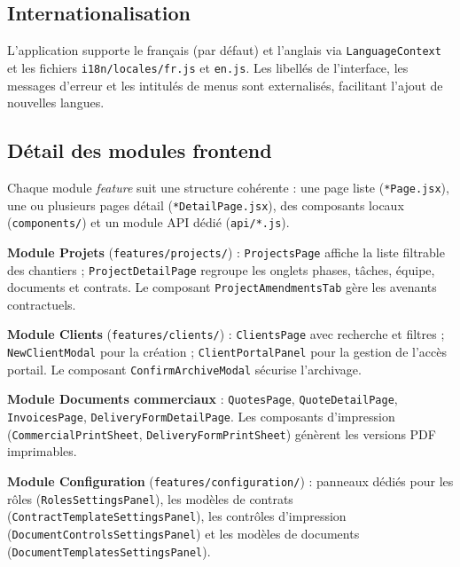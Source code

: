 \subsection{Internationalisation}

L'application supporte le français (par défaut) et l'anglais via \texttt{LanguageContext}
et les fichiers \texttt{i18n/locales/fr.js} et \texttt{en.js}. Les libellés de
l'interface, les messages d'erreur et les intitulés de menus sont externalisés,
facilitant l'ajout de nouvelles langues.

\subsection{Détail des modules frontend}

Chaque module \textit{feature} suit une structure cohérente : une page liste
(\texttt{*Page.jsx}), une ou plusieurs pages détail (\texttt{*DetailPage.jsx}),
des composants locaux (\texttt{components/}) et un module API dédié
(\texttt{api/*.js}).

\medskip

\textbf{Module Projets} (\texttt{features/projects/}) : \texttt{ProjectsPage} affiche
la liste filtrable des chantiers ; \texttt{ProjectDetailPage} regroupe les onglets
phases, tâches, équipe, documents et contrats. Le composant \texttt{ProjectAmendmentsTab}
gère les avenants contractuels.

\medskip

\textbf{Module Clients} (\texttt{features/clients/}) : \texttt{ClientsPage} avec
recherche et filtres ; \texttt{NewClientModal} pour la création ; \texttt{ClientPortalPanel}
pour la gestion de l'accès portail. Le composant \texttt{ConfirmArchiveModal} sécurise
l'archivage.

\medskip

\textbf{Module Documents commerciaux} : \texttt{QuotesPage}, \texttt{QuoteDetailPage},
\texttt{InvoicesPage}, \texttt{DeliveryFormDetailPage}. Les composants d'impression
(\texttt{CommercialPrintSheet}, \texttt{DeliveryFormPrintSheet}) génèrent les
versions PDF imprimables.

\medskip

\textbf{Module Configuration} (\texttt{features/configuration/}) : panneaux dédiés
pour les rôles (\texttt{RolesSettingsPanel}), les modèles de contrats
(\texttt{ContractTemplateSettingsPanel}), les contrôles d'impression
(\texttt{DocumentControlsSettingsPanel}) et les modèles de documents
(\texttt{DocumentTemplatesSettingsPanel}).

